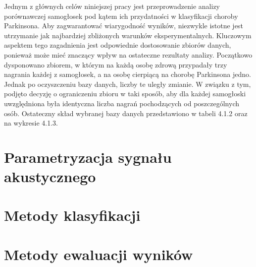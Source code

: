 Jednym z głównych celów niniejszej pracy jest przeprowadzenie analizy porównawczej
samogłosek pod kątem ich przydatności w klasyfikacji choroby Parkinsona.
Aby zagwarantować wiarygodność wyników, niezwykle istotne jest utrzymanie jak najbardziej zbliżonych warunków
eksperymentalnych.
Kluczowym aspektem tego zagadnienia jest odpowiednie dostosowanie zbiorów
danych, ponieważ może mieć znaczący wpływ na ostateczne rezultaty analizy.
Początkowo dysponowano zbiorem, w którym na każdą osobę zdrową przypadały trzy nagrania każdej z samogłosek, a na osobę cierpiącą na chorobę Parkinsona jedno.
Jednak po oczyszczeniu bazy danych, liczby te uległy zmianie.
W związku z tym, podjęto decyzję o ograniczeniu zbioru w taki sposób, aby dla każdej samogłoski uwzględniona była
identyczna liczba nagrań pochodzących od poszczególnych osób. Ostateczny skład wybranej bazy
danych przedstawiono w tabeli 4.1.2 oraz na wykresie 4.1.3.


\section{Parametryzacja sygnału akustycznego}
\label{sec:parametryzacja-sygnalu-akustycznego}


\section{Metody klasyfikacji}
\label{sec:klasyfikacja}


\section{Metody ewaluacji wyników}
\label{sec:metody-ewaluacji-wyników}